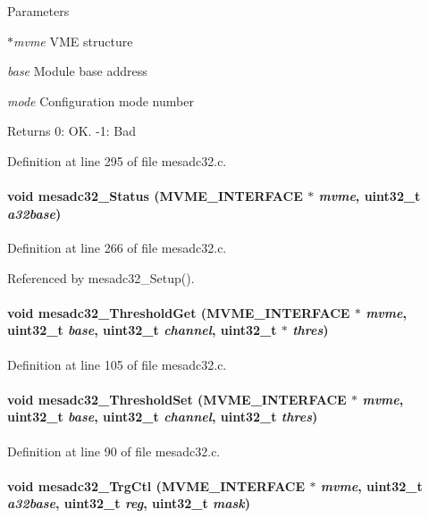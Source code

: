 \begin{DoxyParams}{Parameters}
\item[{\em $\ast$mvme}]VME structure \item[{\em base}]Module base address \item[{\em mode}]Configuration mode number \end{DoxyParams}
\begin{DoxyReturn}{Returns}
0: OK. -\/1: Bad 
\end{DoxyReturn}


Definition at line 295 of file mesadc32.c.
\paragraph[{mesadc32\_\-Status}]{\setlength{\rightskip}{0pt plus 5cm}void mesadc32\_\-Status ({\bf MVME\_\-INTERFACE} $\ast$ {\em mvme}, \/  uint32\_\-t {\em a32base})}\hfill\label{mesadc32drv_8h_af267dd2c6a6c06889f067b34bba3ca84}


Definition at line 266 of file mesadc32.c.

Referenced by mesadc32\_\-Setup().
\paragraph[{mesadc32\_\-ThresholdGet}]{\setlength{\rightskip}{0pt plus 5cm}void mesadc32\_\-ThresholdGet ({\bf MVME\_\-INTERFACE} $\ast$ {\em mvme}, \/  uint32\_\-t {\em base}, \/  uint32\_\-t {\em channel}, \/  uint32\_\-t $\ast$ {\em thres})}\hfill\label{mesadc32drv_8h_a7ebf33314f2367bf00111c35a6515174}


Definition at line 105 of file mesadc32.c.
\paragraph[{mesadc32\_\-ThresholdSet}]{\setlength{\rightskip}{0pt plus 5cm}void mesadc32\_\-ThresholdSet ({\bf MVME\_\-INTERFACE} $\ast$ {\em mvme}, \/  uint32\_\-t {\em base}, \/  uint32\_\-t {\em channel}, \/  uint32\_\-t {\em thres})}\hfill\label{mesadc32drv_8h_a3c2a3c654a0b4400ebd7f41affca16f0}


Definition at line 90 of file mesadc32.c.
\paragraph[{mesadc32\_\-TrgCtl}]{\setlength{\rightskip}{0pt plus 5cm}void mesadc32\_\-TrgCtl ({\bf MVME\_\-INTERFACE} $\ast$ {\em mvme}, \/  uint32\_\-t {\em a32base}, \/  uint32\_\-t {\em reg}, \/  uint32\_\-t {\em mask})}\hfill\label{mesadc32drv_8h_a2a06086dbac388d41f1a5b522b6179c5}
